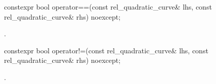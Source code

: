 %
\begin{itemdecl}
constexpr bool operator==(const rel_quadratic_curve& lhs,
  const rel_quadratic_curve& rhs) noexcept;
\end{itemdecl}
\begin{itemdescr}
\pnum
\returns
{}.
\end{itemdescr}

%
\begin{itemdecl}
constexpr bool operator!=(const rel_quadratic_curve& lhs,
  const rel_quadratic_curve& rhs) noexcept;
\end{itemdecl}
\begin{itemdescr}
\pnum
\returns
{}.
\end{itemdescr}
